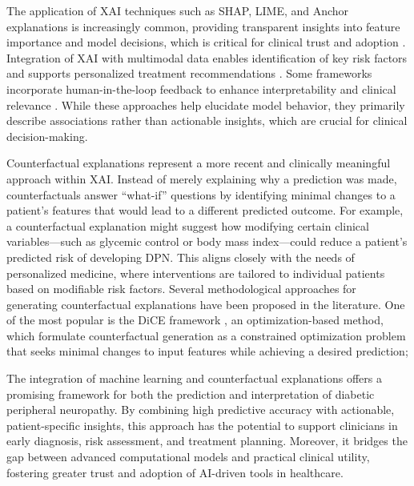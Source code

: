 \documentclass[fleqn,10pt]{wlscirep}
\begin{document}
The application of XAI techniques such as SHAP, LIME, and Anchor explanations is increasingly common, providing transparent insights into feature importance and model decisions, which is critical for clinical trust and adoption \cite{wu2025prognostic,jiang2024multifeature, pandey2024decoding, wu2024interpretable, sheikh2025predicting}. Integration of XAI with multimodal data enables identification of key risk factors and supports personalized treatment recommendations \cite{nguyen2024interpretable, alHudaibi2025explainable}. Some frameworks incorporate human-in-the-loop feedback to enhance interpretability and clinical relevance \cite{lalwani2025generative}. While these approaches help elucidate model behavior, they primarily describe associations rather than actionable insights, which are crucial for clinical decision-making.

Counterfactual explanations represent a more recent and clinically meaningful approach within XAI. Instead of merely explaining why a prediction was made, counterfactuals answer “what-if” questions by identifying minimal changes to a patient’s features that would lead to a different predicted outcome. For example, a counterfactual explanation might suggest how modifying certain clinical variables—such as glycemic control or body mass index—could reduce a patient’s predicted risk of developing DPN. This aligns closely with the needs of personalized medicine, where interventions are tailored to individual patients based on modifiable risk factors. Several methodological approaches for generating counterfactual explanations have been proposed in the literature. One of the most popular is the DiCE framework \cite{mothilal2020explaining}, an optimization-based method, which formulate counterfactual generation as a constrained optimization problem that seeks minimal changes to input features while achieving a desired prediction;

The integration of machine learning and counterfactual explanations offers a promising framework for both the prediction and interpretation of diabetic peripheral neuropathy. By combining high predictive accuracy with actionable, patient-specific insights, this approach has the potential to support clinicians in early diagnosis, risk assessment, and treatment planning. Moreover, it bridges the gap between advanced computational models and practical clinical utility, fostering greater trust and adoption of AI-driven tools in healthcare. 
\end{document}
